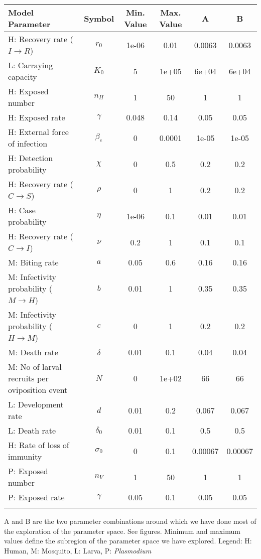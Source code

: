 \begin{table}
\noindent
\begin{tabular}{p{5cm}ccccc}
{\bf Model Parameter} & {\bf Symbol} & {\bf Min. Value} & {\bf Max. Value} & {\bf A} & {\bf B}\\
\hline\hline
  H: Recovery rate ($I \rightarrow R$) & $r_0$ & 1e-06 & 0.01 & 0.0063 & 0.0063\\
  L: Carraying capacity & $K_0$ &    5 & 1e+05 & 6e+04 & 6e+04\\
  H: Exposed number & $n_H$ &    1 &   50 &    1 &    1\\
  H: Exposed rate & $\gamma$ & 0.048 & 0.14 & 0.05 & 0.05\\
  H: External force of infection & $\beta_e$ &    0 & 0.0001 & 1e-05 & 1e-05\\
  H: Detection probability & $\chi$ &    0 &  0.5 &  0.2 &  0.2\\
  H: Recovery rate ($C \rightarrow S$) & $\rho$ &    0 &    1 &  0.2 &  0.2\\
  H: Case probability & $\eta$ & 1e-06 &  0.1 & 0.01 & 0.01\\
  H: Recovery rate ($C \rightarrow I$) & $\nu$ &  0.2 &    1 &  0.1 &  0.1\\
  M: Biting rate & $a$ & 0.05 &  0.6 & 0.16 & 0.16\\
  M: Infectivity probability ($M \rightarrow H$) & $b$ & 0.01 &    1 & 0.35 & 0.35\\
  M: Infectivity probability ($H \rightarrow M$) & $c$ &    0 &    1 &  0.2 &  0.2\\
  M: Death rate & $\delta$ & 0.01 &  0.1 & 0.04 & 0.04\\
  M: No of larval recruits per oviposition event & $N$ &    0 & 1e+02 &   66 &   66\\
  L: Development rate & $d$ & 0.01 &  0.2 & 0.067 & 0.067\\
  L: Death rate & $\delta_0$ & 0.01 &  0.1 &  0.5 &  0.5\\
  H: Rate of loss of immunity & $\sigma_0$ &    0 &  0.1 & 0.00067 & 0.00067\\
  P: Exposed number & $n_V$ &    1 &   50 &    1 &    1\\
  P: Exposed rate & $\gamma$ & 0.05 &  0.1 & 0.05 & 0.05\\
\hline\hline
\smallskip
\end{tabular}
 A and B are the two parameter combinations around which we have done most of the exploration of the parameter space. See figures. Minimum and maximum values define the subregion of the parameter space we have explored. Legend: {\small H: Human, M: Mosquito, L: Larva, P: {\em Plasmodium}} 
\end{table}
